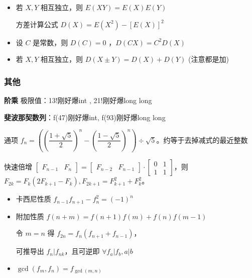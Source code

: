 \documentclass[twocolumn,10pt]{ctexart}
\begin{document}
\begin{itemize}
\item 若 $X,Y$ 相互独立，则 $E(XY)=E(X)E(Y)$

方差计算公式 $D(X)=E(X^2)-[E(X)]^2$
\end{itemize}

\begin{itemize}
\item 设 $C$ 是常数，则 $D(C)=0$ ，$D(CX)=C^2D(X)$
\end{itemize}

\begin{itemize}
\item 若 $X,Y$ 相互独立，则 $D(X\pm Y)=D(X)+D(Y)$ (注意都是加)
\end{itemize}

\subsubsection{其他}

\textbf{阶乘} 极限值：13!刚好爆int , 21!刚好爆long long

\textbf{斐波那契数列}：f(47)刚好爆int, f(93)刚好爆long long

通项 $f_n=\left(\left(\dfrac{1+\sqrt 5}2\right)^n-\left(\dfrac{1-\sqrt 5}2\right)^n\right)\div\sqrt 5$。约等于去掉减式的最近整数

快速倍增 $[\begin{matrix}F_{n-1}&F_n\end{matrix}]=[\begin{matrix}F_{n-2}&F_{n-1}\end{matrix}]\cdot[\begin{matrix}0&1\\1&1\end{matrix}]$，则 $F_{2k}=F_k(2F_{k+1}-F_k),\allowbreak{}F_{2k+1}=F^2_{k+1}+F^2_k$。

\begin{itemize}
\item 卡西尼性质 $f_{n-1}f_{n+1}-f^2_n=(-1)^n$
\end{itemize}

\begin{itemize}
\item 附加性质 $f(n+m)=f(n+1)f(m)+f(n)f(m-1)$

令 $m=n$ 得 $f_{2n}=f_n(f_{n+1}+f_{n-1})$，

可推导出 $f_n|f_{nk}$，且可逆即 $\forall f_a|f_b,a|b$
\end{itemize}

\begin{itemize}
\item $\gcd(f_m,f_n)=f_{\gcd(m,n)}$
\end{itemize}
\end{document}
